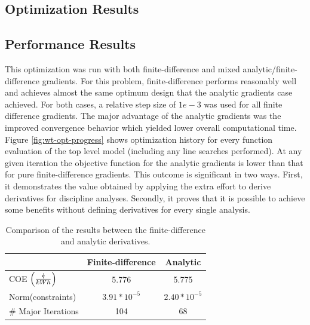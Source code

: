 \documentclass[]{aiaa-tc} %
\newcommand{\cent}{{\mathrm{c}\mkern-6.5mu{\mid}}}
\begin{document}
    \subsection{Optimization Results}

        
    \subsection{Performance Results}
        This optimization was run with both finite-difference and mixed analytic/finite-difference gradients. 
        For this problem, finite-difference performs reasonably well and achieves almost the same optimum design that the 
        analytic gradients case achieved. For both cases, a relative step size of $1e-3$ was used for all 
        finite difference gradients. The major advantage of the analytic gradients was the improved convergence
        behavior which yielded lower overall computational time. Figure \ref{fig:wt-opt-progress} shows optimization 
        history for every function evaluation of the top level model (including any line searches performed). At any given 
        iteration the objective function for the analytic gradients is lower than that for pure finite-difference gradients. 
        This outcome is significant in two ways. First, it demonstrates the value obtained by applying the extra effort to 
        derive derivatives for discipline analyses. Secondly, it proves that it is possible to achieve some benefits without 
        defining derivatives for every single analysis. 


        \begin{table}
            \centering
            \caption{Comparison of the results between the finite-difference and analytic derivatives.}
            \begin{tabular}{l c c}
                \hline
                             & Finite-difference & Analytic \\
                \hline
                COE $\left(\frac{\cent}{kWh}\right)$         & 5.776  & 5.775 \\  \hline
                Norm(constraints)                    & $3.91*10^{-5}$ & $2.40*10^{-5}$  \\  \hline
                \# Major Iterations                   &  104 & 68  \\ 
                \hline
            \end{tabular}   
            \label{tab:wt-fd-speeds}
        \end{table}
\end{document}
